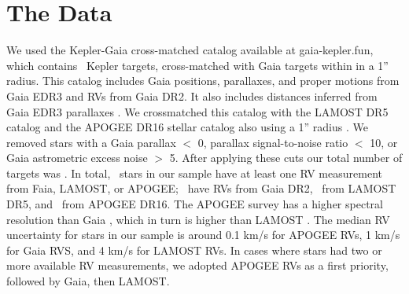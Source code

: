 \section{The Data}
\label{sec:data}

We used the Kepler-Gaia cross-matched catalog available at gaia-kepler.fun,
which contains \nfun\ Kepler targets, cross-matched with Gaia targets within
in a 1'' radius.
This catalog includes Gaia positions, parallaxes, and proper motions from
Gaia EDR3 and RVs from Gaia DR2.
It also includes distances inferred from Gaia EDR3 parallaxes
\citep{bailer-jones2021}.
We crossmatched this catalog with the LAMOST DR5 catalog and the APOGEE DR16
stellar catalog also using a 1'' radius \citep{cui2012, apogee_dr16,
xiang2019}.
We removed stars with a Gaia parallax $<$ 0, parallax signal-to-noise ratio
$<$ 10, or Gaia astrometric excess noise $>$ 5.
After applying these cuts our total number of targets was \nstars.
In total, \nrv\ stars in our sample have at least one RV measurement from
Faia, LAMOST, or APOGEE; \ngaia\ have RVs from Gaia DR2, \nlamost\ from LAMOST
DR5, and \napogee\ from APOGEE DR16.
The APOGEE survey \citep[R $=$ 22,500;][]{apogee} has a higher spectral
resolution than Gaia \citep[R $=$ 11,500;][]{cropper2018}, which in turn is
higher than LAMOST \citep[R $=$ 1,800;][]{zhao2012}.
The median RV uncertainty for stars in our sample is around 0.1 km/s for
APOGEE RVs, 1 km/s for Gaia RVS, and 4 km/s for LAMOST RVs.
In cases where stars had two or more available RV measurements, we adopted
APOGEE RVs as a first priority, followed by Gaia, then LAMOST.

